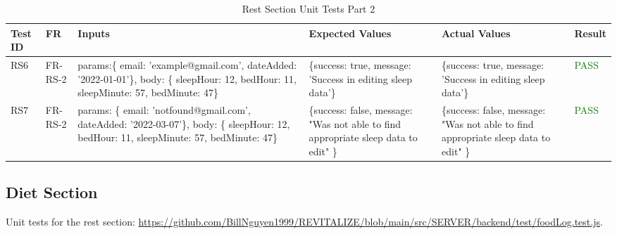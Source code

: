 \documentclass[12pt, titlepage]{article}
\begin{document}
\begin{table}[h]
    \centering
    \small
    \begin{tabularx}{\textwidth}{|X|X|p{3cm}|p{2.5cm}|p{2.5cm}|X|}
        \hline
        Test ID & FR & Inputs & Expected Values & Actual Values & Result \\
        \hline
        RS6 & FR-RS-2 & params:\{ email: 'example@gmail.com', dateAdded: '2022-01-01'\},
        body: \{ sleepHour: 12, bedHour: 11, sleepMinute: 57, bedMinute: 47\}  & \{success: true, message: 'Success in editing sleep data'\} & \{success: true, message: 'Success in editing sleep data'\} & \textcolor{Green}{PASS} \\
        \hline
        RS7 & FR-RS-2 & params: \{ email: 'notfound@gmail.com', dateAdded: '2022-03-07'\},
          body: \{ sleepHour: 12, bedHour: 11, sleepMinute: 57, bedMinute: 47\}  & \{success: false, message: "Was not able to find appropriate sleep data to edit" \} & \{success: false, message: "Was not able to find appropriate sleep data to edit" \} & \textcolor{Green}{PASS} \\
        \hline
    \end{tabularx}
    \caption{Rest Section Unit Tests Part 2}
    \label{table:rest-unit-tests2}
\end{table}

\newpage

\subsection{Diet Section}

Unit tests for the rest section: \url{https://github.com/BillNguyen1999/REVITALIZE/blob/main/src/SERVER/backend/test/foodLog.test.js}.
\end{document}
